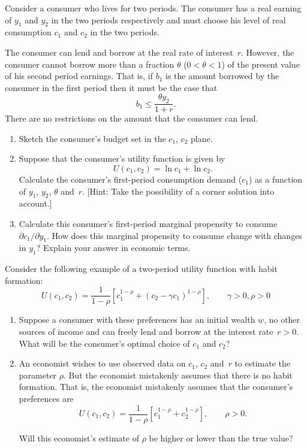 \documentclass[11pt,reqno,openany]{amsbook}
\begin{document}
\begin{exercises}
\item Consider a consumer who lives for two periods. The
  consumer has a real earning of $y_1$ and $y_2$ in the two
  periods respectively and must choose his level of real
  consumption $c_1$ and $c_2$ in the two periods.

  The consumer can lend and borrow at the real rate of
  interest~$r$. However, the consumer cannot borrow more
  than a fraction $\theta$ ($0<\theta<1$) of the present value of his second period
  earnings. That is, if $b_1$ is the amount borrowed by the
  consumer in the first period then it must be the case that
  \[b_1 \leq \frac{\theta y_2}{1+r}.\] There are no
  restrictions on the amount that the consumer can lend.

  \begin{enumerate}
    \item Sketch the consumer's budget set in the $c_1$, $c_2$ plane.
    \item Suppose that the consumer's utility function is given by
      \[U(c_1,c_2)=\ln c_1+\ln c_2.\] Calculate the
      consumer's first-period consumption demand ($c_1$) as
      a function of $y_1$, $y_2$, $\theta$ and~$r$.
      [Hint: Take the possibility of a corner solution into account.]
    \item Calculate this consumer's first-period marginal
      propensity to consume $\partial c_1/\partial y_1$. How
      does this marginal propensity to consume change with
      changes in $y_1$? Explain your answer in economic
      terms.
    \end{enumerate}

  \item Consider the following example of a two-period utility
    function with habit formation:
    \[U(c_1,c_2)=\frac{1}{1-\rho}[c_1^{1-\rho}+(c_2-\gamma
    c_1)^{1-\rho}],\qquad \gamma>0,\rho>0\]
    \begin{enumerate}
    \item Suppose a consumer with these preferences has an
      initial wealth $w$, no other sources of income and can
      freely lend and borrow at the interest rate~$r>0$.
      What will be the consumer's optimal choice of $c_1$
      and $c_2$?
    \item An economist wishes to use observed data on $c_1$,
      $c_2$ and~$r$ to estimate the parameter $\rho$. But
      the economist mistakenly assumes that there is no
      habit formation. That is, the economist mistakenly
      assumes that the consumer's preferences are
      \[U(c_1,c_2)=\frac{1}{1-\rho}[c_1^{1-\rho}+c_2^{1-\rho}],\qquad
      \rho>0.\]

      Will this economist's estimate of $\rho$ be higher or
      lower than the true value?
    \end{enumerate}
\end{exercises}
\end{document}
